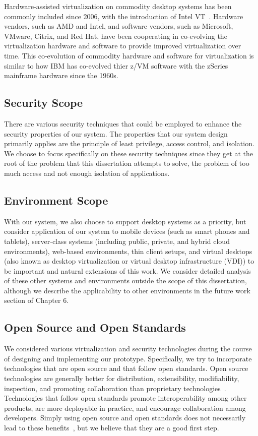 Hardware-assisted virtualization on commodity desktop systems has been commonly included since 2006, with the introduction of Intel VT~\cite{van_Doorn_2006}. Hardware vendors, such as AMD and Intel, and software vendors, such as Microsoft, VMware, Citrix, and Red Hat, have been cooperating in co-evolving the virtualization hardware and software to provide improved virtualization over time. This co-evolution of commodity hardware and software for virtualization is similar to how IBM has co-evolved thier z/VM software with the zSeries mainframe hardware since the 1960s.

\subsection{Security Scope}

There are various security techniques that could be employed to enhance the security properties of our system. The properties that our system design primarily applies are the principle of least privilege, access control, and isolation. We choose to focus specifically on these security techniques since they get at the root of the problem that this dissertation attempts to solve, the problem of too much access and not enough isolation of applications.

\subsection{Environment Scope}

With our system, we also choose to support desktop systems as a priority, but consider application of our system to mobile devices (such as smart phones and tablets), server-class systems (including public, private, and hybrid cloud environments), web-based environments, thin client setups, and virtual desktops (also known as desktop virtualization or virtual desktop infrastructure (VDI)) to be important and natural extensions of this work. We consider detailed analysis of these other systems and environments outside the scope of this dissertation, although we describe the applicability to other environments in the future work section of Chapter 6.

\subsection{Open Source and Open Standards}

We considered various virtualization and security technologies during the course of designing and implementing our prototype. Specifically, we try to incorporate technologies that are open source and that follow open standards. Open source technologies are generally better for distribution, extensibility, modifiability, inspection, and promoting collaboration than proprietary technologies~\cite{ben-yehuda_osr_2008}. Technologies that follow open standards promote interoperability among other products, are more deployable in practice, and encourage collaboration among developers. Simply using open source and open standards does not necessarily lead to these benefits~\cite{crosby_blog_interoperability_2010,gigaom_blog_2010}, but we believe that they are a good first step.

